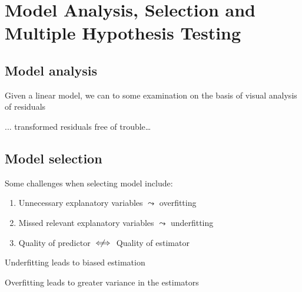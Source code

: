 \section{Model Analysis, Selection and Multiple Hypothesis Testing}

\subsection{Model analysis}

Given a linear model, we can to some examination on the basis of visual analysis of residuals




... transformed residuals free of trouble\dots
{}

\subsection{Model selection}
Some challenges when selecting model include:
\begin{enumerate}
    \item Unnecessary explanatory variables $\leadsto$ overfitting
    \item Missed relevant explanatory variables $\leadsto$ underfitting
    \item Quality of predictor $\centernot\iff$ Quality of estimator
\end{enumerate}


Underfitting leads to biased estimation

Overfitting leads to greater variance in the estimators


